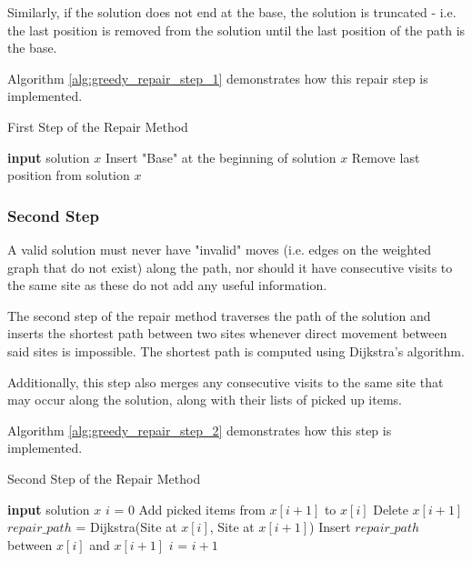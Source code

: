 \documentclass[conference]{IEEEtran}
\begin{document}
Similarly, if the solution does not end at the base, the solution is truncated - i.e. the last position is removed from the solution until the last position of the path is the base.

Algorithm \ref{alg:greedy_repair_step_1} demonstrates how this repair step is implemented.

\begin{algorithm}[h!]
\caption{First Step of the Repair Method}
\label{alg:greedy_repair_step_1}
\begin{algorithmic}[1]
\State \textbf{input} solution $x$
\State Insert "Base" at the beginning of solution $x$
\EndIf
{}
\State Remove last position from solution $x$
\EndWhile
\end{algorithmic}
\end{algorithm}

\subsubsection{Second Step}

A valid solution must never have "invalid" moves (i.e. edges on the weighted graph that do not exist) along the path, nor should it have consecutive visits to the same site as these do not add any useful information.

The second step of the repair method traverses the path of the solution and inserts the shortest path between two sites whenever direct movement between said sites is impossible. The shortest path is computed using Dijkstra's algorithm.

Additionally, this step also merges any consecutive visits to the same site that may occur along the solution, along with their lists of picked up items.

Algorithm \ref{alg:greedy_repair_step_2} demonstrates how this step is implemented.

\begin{algorithm}[h!]
\caption{Second Step of the Repair Method}
\label{alg:greedy_repair_step_2}
\begin{algorithmic}[1]
\State \textbf{input} solution $x$
\State $i$ = $0$
\State Add picked items from $x[i+1]$ to $x[i]$
\State Delete $x[i+1]$
\State $repair\_path$ = Dijkstra(Site at $x[i]$, Site at $x[i+1]$)
\State Insert $repair\_path$ between $x[i]$ and $x[i+1]$
\Else
\State $i$ = $i + 1$
\EndIf
\EndWhile
\end{algorithmic}
\end{algorithm}
\end{document}
